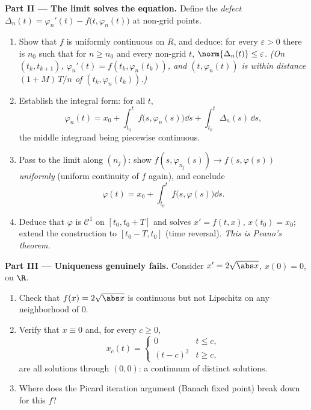 \begin{problem}[{Weekend problem --- existence of solutions of
$x' = f(t, x)$ without Lipschitz}]
\medskip
\noindent\textbf{Part II --- The limit solves the equation.}
Define the \emph{defect} $\Delta_n(t) = \varphi_n'(t) -
f\bigl(t, \varphi_n(t)\bigr)$ at non-grid points.
\begin{enumerate}[resume]
  \item Show that $f$ is uniformly continuous on $R$, and
        deduce: for every $\varepsilon > 0$ there is $n_0$ such
        that for $n \geq n_0$ and every non-grid $t$,
        $\norm{\Delta_n(t)} \leq \varepsilon$. \emph{(On $(t_k,
        t_{k+1})$, $\varphi_n'(t) = f(t_k, \varphi_n(t_k))$,
        and $(t, \varphi_n(t))$ is within distance
        $(1 + M)\,T/n$ of $(t_k, \varphi_n(t_k))$.)}
  \item Establish the integral form: for all $t$,
        \[
        \varphi_n(t) = x_0 + \int_{t_0}^{t}
        f\bigl(s, \varphi_n(s)\bigr)\dd s +
        \int_{t_0}^t \Delta_n(s)\,\dd s,
        \]
        the middle integrand being piecewise continuous.
  \item Pass to the limit along $(n_j)$: show
        $f(s, \varphi_{n_j}(s)) \to f(s, \varphi(s))$
        \emph{uniformly} (uniform continuity of $f$ again), and
        conclude
        \[
        \varphi(t) = x_0 + \int_{t_0}^t
        f\bigl(s, \varphi(s)\bigr)\dd s .
        \]
  \item Deduce that $\varphi$ is $\mathcal C^1$ on $[t_0, t_0 +
        T]$ and solves $x' = f(t, x)$, $x(t_0) = x_0$; extend
        the construction to $[t_0 - T, t_0]$ (time reversal).
        \emph{This is Peano's theorem.}
\end{enumerate}

\medskip
\noindent\textbf{Part III --- Uniqueness genuinely fails.}
Consider $x' = 2\sqrt{\abs x}$, $x(0) = 0$, on $\R$.
\begin{enumerate}[resume]
  \item Check that $f(x) = 2\sqrt{\abs x}$ is continuous but
        not Lipschitz on any neighborhood of $0$.
  \item Verify that $x \equiv 0$ and, for every $c \geq 0$,
        \[
        x_c(t) = \begin{cases} 0 & t \leq c,\\ (t - c)^2 & t
        \geq c,\end{cases}
        \]
        are all solutions through $(0,0)$: a continuum of
        distinct solutions.
  \item Where does the Picard iteration argument (Banach fixed
        point) break down for this $f$?
\end{enumerate}


\end{problem}
